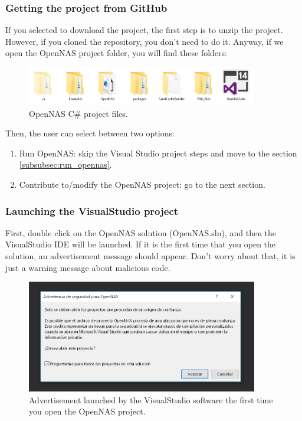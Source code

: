 \subsubsection{Getting the project from GitHub}

If you selected to download the project, the first step is to unzip the project. However, if you cloned the repository, you don't need to do it. Anyway, if we open the OpenNAS project folder, you will find these folders:

\begin{figure}[H]
\centering
\includegraphics[width=0.9\textwidth]{images/Img10_OpenNAS_project.PNG}
\caption{\label{fig:OpenNAS_unziped_project}OpenNAS C\# project files.}
\end{figure}

Then, the user can select between two options:

\begin{enumerate}
    \item Run OpenNAS: skip the Visual Studio project steps and move to the section \ref{subsubsec:run_opennas}.
    \item Contribute to/modify the OpenNAS project: go to the next section.
\end{enumerate}


\subsubsection{Launching the VisualStudio project}

First, double click on the OpenNAS solution (OpenNAS.sln), and then the VisualStudio IDE will be launched. If it is the first time that you open the solution, an advertisement message should appear. Don't worry about that, it is just a warning message about malicious code.

\begin{figure}[H]
\centering
\includegraphics[width=0.9\textwidth]{images/Img11_VS_Advertencia_Seguridad.PNG}
\caption{\label{fig:VS_advertisement}Advertisement launched by the VisualStudio software the first time you open the OpenNAS project.}
\end{figure}

